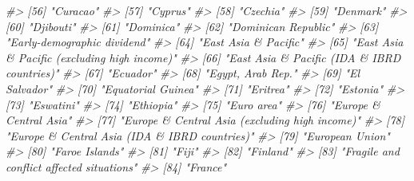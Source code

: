 \documentclass[
  xelatex, ja=standard]{bxjsbook}
\newenvironment{Shaded}{\begin{snugshade}}{\end{snugshade}}
\newcommand{\CommentTok}[1]{\textcolor[rgb]{0.56,0.35,0.01}{\textit{#1}}}
\theoremstyle{definition}
\theoremstyle{definition}
\theoremstyle{definition}
\theoremstyle{definition}
\theoremstyle{remark}
\begin{document}
\begin{Shaded}
\begin{Highlighting}[]
\CommentTok{\#\textgreater{}  [56] "Curacao"                                             }
\CommentTok{\#\textgreater{}  [57] "Cyprus"                                              }
\CommentTok{\#\textgreater{}  [58] "Czechia"                                             }
\CommentTok{\#\textgreater{}  [59] "Denmark"                                             }
\CommentTok{\#\textgreater{}  [60] "Djibouti"                                            }
\CommentTok{\#\textgreater{}  [61] "Dominica"                                            }
\CommentTok{\#\textgreater{}  [62] "Dominican Republic"                                  }
\CommentTok{\#\textgreater{}  [63] "Early{-}demographic dividend"                          }
\CommentTok{\#\textgreater{}  [64] "East Asia \& Pacific"                                 }
\CommentTok{\#\textgreater{}  [65] "East Asia \& Pacific (excluding high income)"         }
\CommentTok{\#\textgreater{}  [66] "East Asia \& Pacific (IDA \& IBRD countries)"          }
\CommentTok{\#\textgreater{}  [67] "Ecuador"                                             }
\CommentTok{\#\textgreater{}  [68] "Egypt, Arab Rep."                                    }
\CommentTok{\#\textgreater{}  [69] "El Salvador"                                         }
\CommentTok{\#\textgreater{}  [70] "Equatorial Guinea"                                   }
\CommentTok{\#\textgreater{}  [71] "Eritrea"                                             }
\CommentTok{\#\textgreater{}  [72] "Estonia"                                             }
\CommentTok{\#\textgreater{}  [73] "Eswatini"                                            }
\CommentTok{\#\textgreater{}  [74] "Ethiopia"                                            }
\CommentTok{\#\textgreater{}  [75] "Euro area"                                           }
\CommentTok{\#\textgreater{}  [76] "Europe \& Central Asia"                               }
\CommentTok{\#\textgreater{}  [77] "Europe \& Central Asia (excluding high income)"       }
\CommentTok{\#\textgreater{}  [78] "Europe \& Central Asia (IDA \& IBRD countries)"        }
\CommentTok{\#\textgreater{}  [79] "European Union"                                      }
\CommentTok{\#\textgreater{}  [80] "Faroe Islands"                                       }
\CommentTok{\#\textgreater{}  [81] "Fiji"                                                }
\CommentTok{\#\textgreater{}  [82] "Finland"                                             }
\CommentTok{\#\textgreater{}  [83] "Fragile and conflict affected situations"            }
\CommentTok{\#\textgreater{}  [84] "France"                                              }

\end{Highlighting}
\end{Shaded}
\end{document}
